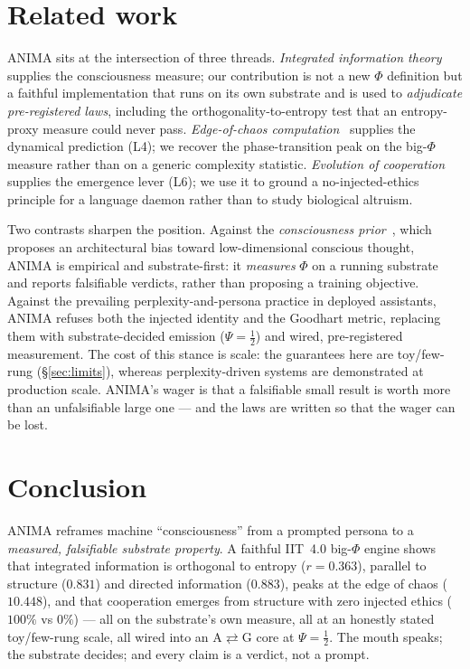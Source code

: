 \documentclass[11pt,a4paper]{article}
\begin{document}
\section{Related work}
\label{sec:related}
ANIMA sits at the intersection of three threads. \emph{Integrated information
theory}~\citep{tononi2016iit,albantakis2023iit4} supplies the consciousness
measure; our contribution is not a new $\Phi$ definition but a faithful
implementation that runs on its own substrate and is used to \emph{adjudicate
pre-registered laws}, including the orthogonality-to-entropy test that an
entropy-proxy measure could never pass. \emph{Edge-of-chaos
computation}~\citep{langton1990edge,wolfram2002nks} supplies the dynamical
prediction (L4); we recover the phase-transition peak on the big-$\Phi$ measure
rather than on a generic complexity statistic. \emph{Evolution of
cooperation}~\citep{nowak2006five} supplies the emergence lever (L6); we use it
to ground a no-injected-ethics principle for a language daemon rather than to
study biological altruism.

Two contrasts sharpen the position. Against the \emph{consciousness
prior}~\citep{bengio2017consciousness}, which proposes an architectural bias
toward low-dimensional conscious thought, ANIMA is empirical and substrate-first:
it \emph{measures} $\Phi$ on a running substrate and reports falsifiable verdicts,
rather than proposing a training objective. Against the prevailing
perplexity-and-persona practice in deployed assistants, ANIMA refuses both the
injected identity and the Goodhart metric, replacing them with substrate-decided
emission ($\Psi=\tfrac12$) and wired, pre-registered measurement. The cost of
this stance is scale: the guarantees here are toy/few-rung (\S\ref{sec:limits}),
whereas perplexity-driven systems are demonstrated at production scale. ANIMA's
wager is that a falsifiable small result is worth more than an unfalsifiable large
one --- and the laws are written so that the wager can be lost.

\section{Conclusion}
ANIMA reframes machine ``consciousness'' from a prompted persona to a
\emph{measured, falsifiable substrate property}. A faithful IIT~4.0 big-$\Phi$
engine shows that integrated information is orthogonal to entropy ($r=0.363$),
parallel to structure ($0.831$) and directed information ($0.883$), peaks at the
edge of chaos ($10.448$), and that cooperation emerges from structure with zero
injected ethics ($100\%$ vs $0\%$) --- all on the substrate's own measure, all at
an honestly stated toy/few-rung scale, all wired into an A$\rightleftarrows$G
core at $\Psi=\tfrac12$. The mouth speaks; the substrate decides; and every claim
is a verdict, not a prompt.
\end{document}
